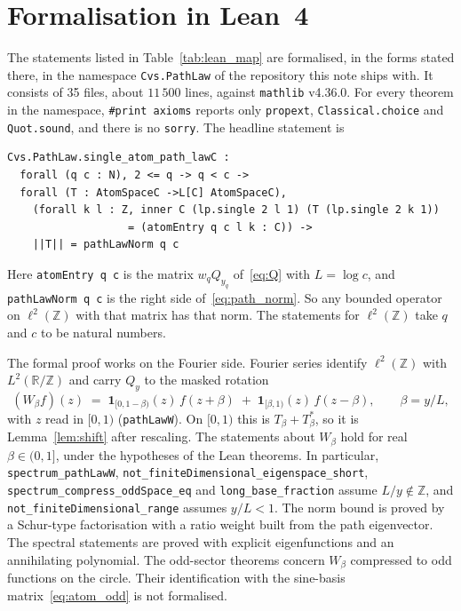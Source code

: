 \documentclass[11pt,a4paper]{article}
\theoremstyle{plain}
\theoremstyle{definition}
\theoremstyle{remark}
\newcommand{\R}{\mathbb{R}}
\newcommand{\Z}{\mathbb{Z}}
\begin{document}
\section{Formalisation in Lean~4}\label{sec:lean}

The statements listed in Table~\ref{tab:lean_map} are formalised, in the forms stated there, in the namespace \texttt{Cvs.PathLaw} of the repository this note ships with. It consists of 35 files, about $11\,500$ lines, against \texttt{mathlib} v4.36.0. For every theorem in the namespace, \texttt{\#print axioms} reports only \texttt{propext}, \texttt{Classical.choice} and \texttt{Quot.sound}, and there is no \texttt{sorry}. The headline statement is
\begin{lstlisting}[style=lean]
Cvs.PathLaw.single_atom_path_lawC :
  forall (q c : N), 2 <= q -> q < c ->
  forall (T : AtomSpaceC ->L[C] AtomSpaceC),
    (forall k l : Z, inner C (lp.single 2 l 1) (T (lp.single 2 k 1))
                   = (atomEntry q c l k : C)) ->
    ||T|| = pathLawNorm q c
\end{lstlisting}
Here \texttt{atomEntry q c} is the matrix $w_q Q_{y_q}$ of~\eqref{eq:Q} with $L = \log c$, and \texttt{pathLawNorm q c} is the right side of~\eqref{eq:path_norm}. So any bounded operator on $\ell^2(\Z)$ with that matrix has that norm. The statements for $\ell^2(\Z)$ take $q$ and $c$ to be natural numbers.

The formal proof works on the Fourier side. Fourier series identify $\ell^2(\Z)$ with $L^2(\R/\Z)$ and carry $Q_y$ to the masked rotation
\[
  (W_\beta f)(z) \;=\; \mathbf 1_{[0,1-\beta)}(z)\, f(z+\beta) \;+\; \mathbf 1_{[\beta,1)}(z)\, f(z-\beta), \qquad \beta = y/L,
\]
with $z$ read in $[0,1)$ (\texttt{pathLawW}). On $[0,1)$ this is $T_\beta + T_\beta^{*}$, so it is Lemma~\ref{lem:shift} after rescaling. The statements about $W_\beta$ hold for real $\beta \in (0, 1]$, under the hypotheses of the Lean theorems. In particular, \texttt{spectrum\_\allowbreak pathLawW}, \texttt{not\_\allowbreak finiteDimensional\_\allowbreak eigenspace\_\allowbreak short}, \texttt{spectrum\_\allowbreak compress\_\allowbreak oddSpace\_\allowbreak eq} and \texttt{long\_\allowbreak base\_\allowbreak fraction} assume $L/y \notin \Z$, and \texttt{not\_\allowbreak finiteDimensional\_\allowbreak range} assumes $y/L < 1$. The norm bound is proved by a Schur-type factorisation with a ratio weight built from the path eigenvector. The spectral statements are proved with explicit eigenfunctions and an annihilating polynomial. The odd-sector theorems concern $W_\beta$ compressed to odd functions on the circle. Their identification with the sine-basis matrix~\eqref{eq:atom_odd} is not formalised.
\end{document}
